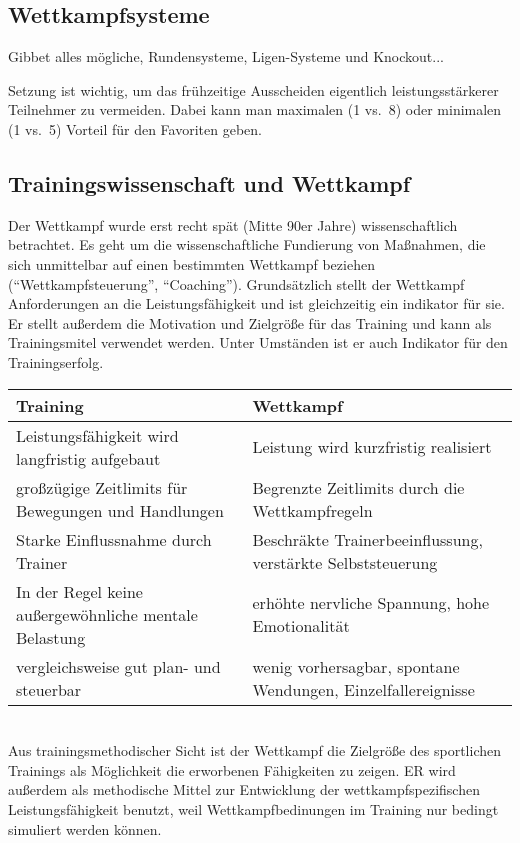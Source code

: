 \subsection{Wettkampfsysteme}

Gibbet alles mögliche, Rundensysteme, Ligen-Systeme und Knockout...

Setzung ist wichtig, um das frühzeitige Ausscheiden eigentlich leistungsstärkerer Teilnehmer zu vermeiden. Dabei kann man maximalen (1 vs.\ 8) oder minimalen (1 vs.\ 5) Vorteil für den Favoriten geben.

\subsection{Trainingswissenschaft und Wettkampf}

Der Wettkampf wurde erst recht spät (Mitte 90er Jahre) wissenschaftlich betrachtet. Es geht um die wissenschaftliche Fundierung von Maßnahmen, die sich unmittelbar auf einen bestimmten Wettkampf beziehen (``Wettkampfsteuerung'', ``Coaching''). Grundsätzlich stellt der Wettkampf Anforderungen an die Leistungsfähigkeit und ist gleichzeitig ein indikator für sie. Er stellt außerdem die Motivation und Zielgröße für das Training und kann als Trainingsmitel verwendet werden. Unter Umständen ist er auch Indikator für den Trainingserfolg.

\begin{tabular}{m{} | m{}}
    Training & Wettkampf \\ \hline
    Leistungsfähigkeit wird langfristig aufgebaut & Leistung wird kurzfristig realisiert \\
    großzügige Zeitlimits für Bewegungen und Handlungen & Begrenzte Zeitlimits durch die Wettkampfregeln \\ Starke Einflussnahme durch Trainer &  Beschräkte Trainerbeeinflussung, verstärkte  Selbststeuerung \\
    In der Regel keine außergewöhnliche mentale Belastung & erhöhte nervliche Spannung, hohe Emotionalität \\
    vergleichsweise gut plan- und steuerbar & wenig vorhersagbar, spontane Wendungen, Einzelfallereignisse \\
\end{tabular}
\\

Aus trainingsmethodischer Sicht ist der Wettkampf die Zielgröße des sportlichen Trainings als Möglichkeit die erworbenen Fähigkeiten zu zeigen.
ER wird außerdem als methodische Mittel zur Entwicklung der wettkampfspezifischen Leistungsfähigkeit benutzt, weil Wettkampfbedinungen im Training nur bedingt simuliert werden können.

